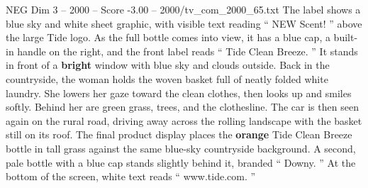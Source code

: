 \begin{textsample}{NEG Dim 3 – 2000 – Score -3.00 – 2000/tv\_com\_2000\_65.txt}
The label shows a blue sky and white sheet graphic, with visible text reading “ NEW Scent! ” above the large Tide logo.
As the full bottle comes into view, it has a blue cap, a built-in handle on the right, and the front label reads “ Tide Clean Breeze. ” It stands in front of a \textbf{bright} window with blue sky and clouds outside.
Back in the countryside, the woman holds the woven basket full of neatly folded white laundry.
She lowers her gaze toward the clean clothes, then looks up and smiles softly.
Behind her are green grass, trees, and the clothesline.
The car is then seen again on the rural road, driving away across the rolling landscape with the basket still on its roof.
The final product display places the \textbf{orange} Tide Clean Breeze bottle in tall grass against the same blue-sky countryside background.
A second, pale bottle with a blue cap stands slightly behind it, branded “ Downy. ” At the bottom of the screen, white text reads “ www.tide.com. ”

\end{textsample}
